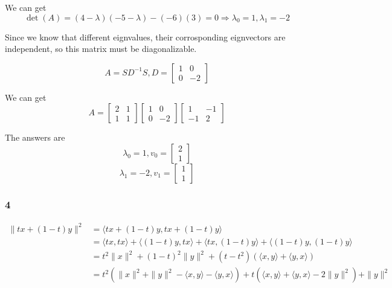 \documentclass{article}
\def\implies{\Longrightarrow}
\begin{document}
We can get 
$$\det(A) = (4 - \lambda)(-5 - \lambda) - (-6)(3) = 0 \implies \lambda_0 = 1, \lambda_1 = -2$$

Since we know that different eignvalues, their corrosponding eignvectors are independent, so this matrix must be diagonalizable. 

$$A = SD^{-1}S, D = \begin{bmatrix}
1 & 0 \\
0 & -2
\end{bmatrix}$$

We can get 
$$A = \begin{bmatrix}2&1\\ 1&1\end{bmatrix}\begin{bmatrix}1&0\\ 0&-2\end{bmatrix}\begin{bmatrix}1&-1\\ -1&2\end{bmatrix}$$

The answers are 
$$\lambda_0 = 1, v_0 = \begin{bmatrix}2\\1\end{bmatrix}$$
$$\lambda_1 = -2, v_1 = \begin{bmatrix}1\\1\end{bmatrix}$$

\subsubsection*{4}

\[
\begin{split}
\|tx + (1 - t)y \| ^ 2 &= \langle tx + (1 - t)y, tx + (1 - t)y \rangle \\
                        &= \langle tx, tx\rangle + \langle (1 - t)y, tx\rangle + \langle tx, (1 - t)y\rangle + \langle (1 - t)y, (1 - t)y\rangle    \\
                        &= t^2 \| x\|^2 + (1 - t)^2\| y\| ^ 2 + (t -  t^2)(\langle  x , y \rangle  + \langle y, x \rangle) \\
                        &= t^2(\|x\|^2 + \|y\|^2 - \langle  x , y \rangle - \langle  y , x \rangle) + t(\langle  x , y \rangle + \langle  y , x \rangle-2 \|y\|^2) + \|y\|^2
\end{split}
\]


\end{document}
